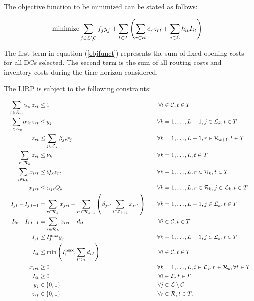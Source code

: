\documentclass[a4paper,10pt]{article}
\begin{document}
\begin{linenumbers}
The objective function to be minimized can be stated as follows: 
 
\begin{equation} \label{objfunct}
    \text{minimize} \sum_{j\in \mathcal{L} \setminus \mathcal{C}} f_{j} y_{j} +\sum_{t\in T} \left( \sum_{r\in \mathcal{R}} c_r z_{rt} + \sum_{i\in \mathcal{L}} h_{it} I_{it}\right)
    \end{equation} 
    
    The first term in equation (\ref{objfunct}) represents the sum of fixed opening costs for all DCs selected. 
    The second term is the sum of all routing costs and inventory costs during the time horizon considered. 
    
  The LIRP is subject to the following constraints:
    
    \begin{alignat}{3}
&&\sum_{r\in \mathcal{R}_L} \alpha_{ir} z_{rt} &\leq 1 						&\forall i&\in \mathcal{C}, t \in T  					\label{const:singleroutecustomers}\\
&&\sum_{r\in \mathcal{R}_k} \alpha_{jr} z_{rt} &\leq y_j 					&\forall k&=1,\ldots,L-1, j\in \mathcal{L}_k, t \in T  \label{const:singleroutedc}\\
&&z_{rt} 					&\leq \sum_{j\in\mathcal{L}_{k}}\beta_{jr}y_j 	&\forall k&=1,\ldots,L-1,r\in \mathcal{R}_{k+1}, t \in T \label{const:startfromopendepots}\\
&&\sum_{r\in \mathcal{R}_k} z_{rt} &\leq 	\nu_k							&\forall k&=1,\ldots,L, t \in T  				\label{const:fleetcapa}\\
&&\sum_{i\in \mathcal{L}_k} x_{irt}   		&\leq Q_k z_{rt} 			&\forall k&=1,\ldots,L,  r\in \mathcal{R}_k, t \in T 	\label{const:deliveryUB}\\
&&x_{jrt}   		&\leq \alpha_{jr} Q_k  						&\forall k&=1,\ldots,L,  r\in \mathcal{R}_k, j \in \mathcal{L}_k, t \in T	\label{const:deliveryConstLoc}\\
&&I_{jt} - I_{j,t-1} &= \sum_{r\in\mathcal{R}_k} x_{jrt} 	- \sum_{r'\in \mathcal{R}_{k+1}}\left(\beta_{jr'} \sum_{i\in \mathcal{L}_{k+1}}x_{ir't}\right)\quad 						&\forall k&=1,\ldots,L-1, j\in \mathcal{L}_k, t \in T 				\label{const:invflowdepots}\\
&&I_{it} - I_{i,t-1} &= \sum_{r\in \mathcal{R}_L} x_{irt} - d_{it} 			&\forall i&\in \mathcal{C},  t \in T					\label{const:invflowcustomers}\\
&&I_{jt}	&\leq I_j^{\max} y_j  									&\forall k&=1,\ldots,L-1,  j\in \mathcal{L}_k, t \in T \label{const:invdepotUB}\\	
&&I_{it} 	&\leq \min\left(I_i^{\max}, \sum_{t' > t}d_{it'}\right)	&\forall i&\in \mathcal{C},  t \in T					\label{const:invcustUB}\\
&&x_{irt}			&\geq 0 										&\forall k&=1,\ldots,L,  i\in \mathcal{L}_k,  r\in \mathcal{R}_k,\forall t \in T	\label{const:upos}	\\
&&I_{it}			&\geq 0 										&\forall i &\in \mathcal{L},  t \in T					\label{const:invCpos}	\\
&&y_{j}				& \in \{0,1\} 								&\forall j&\in \mathcal{L}\setminus\mathcal{C}						\label{const:ybool}\\	
&&z_{rt}			&\in \{0,1\} 									&\forall r&\in \mathcal{R},  t \in T.					\label{const:zbool}
\end{alignat}



\end{linenumbers}
\end{document}
